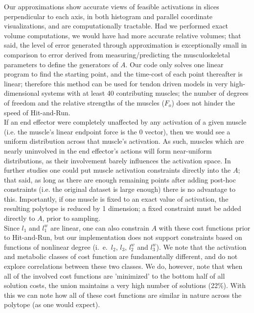 Our approximations show accurate views of feasible activations in slices perpendicular to each axis, in both histogram and parallel coordinate visualizations, and are computationally tractable.
Had we performed exact volume computations, we would have had more accurate relative volumes; that said, the level of error generated through approximation is exceptionally small in comparison to error derived from measuring/predicting the musculoskeletal parameters to define the generators of $A$.
Our code only solves one linear program to find the starting point, and the time-cost of each point thereafter is linear; therefore this method can be used for tendon driven models in very high-dimensional systems with at least 40 contributing muscles; the number of degrees of freedom and the relative strengths of the muscles ($F_o$) does not hinder the speed of Hit-and-Run.\\

If an end effector were completely unaffected by any activation of a given muscle (i.e. the muscle's linear endpoint force is the 0 vector), then we would see a uniform distribution across that muscle's activation. As such, muscles which are nearly uninvolved in the end effector's actions will form near-uniform distributions, as their involvement barely influences the activation space.
In further studies one could put muscle activation constraints directly into the $A$; that said, as long as there are enough remaining points after adding post-hoc constraints (i.e. the original dataset is large enough) there is no advantage to this.
Importantly, if one muscle is fixed to an exact value of activation, the resulting polytope is reduced by 1 dimension; a fixed constraint must be added directly to $A$, prior to sampling.\\
Since $l_1$ and $l_1^w$ are linear, one can also constrain $A$ with these cost functions prior to Hit-and-Run, but our implementation does not support constraints based on functions of nonlinear degree (i.\ e.\ $l_2$, $l_3$, $l_2^w$ and $l_3^w$).
We note that the activation and metabolic classes of cost function are fundamentally different, and do not explore correlations between these two classes.
We do, however, note that when all of the involved cost functions are 'minimized' to the bottom half of all solution costs, the union maintains a very high number of solutions (22\%).
With this we can note how all of these cost functions are similar in nature across the polytope (as one would expect).\\

